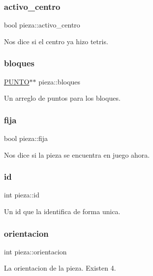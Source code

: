 \subsubsection{\texorpdfstring{activo\+\_\+centro}{activo\_centro}}
{\footnotesize\ttfamily bool pieza\+::activo\+\_\+centro}

Nos dice si el centro ya hizo tetris. \mbox{\label{structpieza_a7571487b8b7378bdc9375be059264df3}} 
\subsubsection{\texorpdfstring{bloques}{bloques}}
{\footnotesize\ttfamily \hyperlink{pieza_8h_a3b9c719c4c783cb9f96e4491fc254368}{P\+U\+N\+TO}$\ast$$\ast$ pieza\+::bloques}

Un arreglo de puntos para los bloques. \mbox{\label{structpieza_a07cee970ed403863a97c571019bf4fe9}} 
\subsubsection{\texorpdfstring{fija}{fija}}
{\footnotesize\ttfamily bool pieza\+::fija}

Nos dice si la pieza se encuentra en juego ahora. \mbox{\label{structpieza_a0cc98244d594b50de5403ac3f7f5717b}} 
\subsubsection{\texorpdfstring{id}{id}}
{\footnotesize\ttfamily int pieza\+::id}

Un id que la identifica de forma unica. \mbox{\label{structpieza_ae2a1a9d087e978703430788ceec169c1}} 
\subsubsection{\texorpdfstring{orientacion}{orientacion}}
{\footnotesize\ttfamily int pieza\+::orientacion}

La orientacion de la pieza. Existen 4. \mbox{\label{structpieza_a1633f17539310c67d0dcc8264891b051}} 
